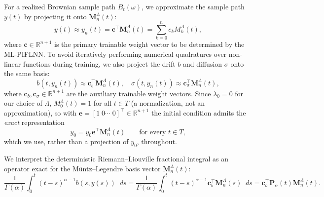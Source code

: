 \documentclass[11pt, a4paper]{article}
\theoremstyle{theoremstyle}
\theoremstyle{definitionstyle}
\newcommand{\dd}{\mathop{}\!d}
\begin{document}
For a realized Brownian sample path $B_t(\omega)$, we approximate the sample path $y(t)$ by projecting it onto $\mathbf M^\Lambda_n(t)$:
\begin{equation}\label{eq:y_approx}
    y(t) \approx y_n(t) = \mathbf c^\top \mathbf M_n^\Lambda (t) = \sum_{k=0}^n c_kM_k^\Lambda(t),
\end{equation}
where $\mathbf c \in \mathbb R^{n+1}$ is the primary trainable weight vector to be determined by the ML-PIFLNN. To avoid iteratively performing numerical quadratures over non-linear functions during training, we also project the drift $b$ and diffusion $\sigma$ onto the same basis:
\begin{equation}\label{eq:phy_approx}
    b(t, y_n(t)) \approx \mathbf c_b^\top \mathbf M_n^\Lambda(t), \quad \sigma(t, y_n(t)) \approx \mathbf c_\sigma^\top \mathbf M^\Lambda_n(t),
\end{equation}
where $\mathbf c_b, \mathbf c_\sigma \in \mathbb R^{n+1}$ are the auxiliary trainable weight vectors. Since $\lambda_0=0$ for our choice of $\Lambda$, $M_0^\Lambda(t) = 1$ for all $t \in T$ (a normalization, not an approximation), so with $\mathbf e = [1 \; 0 \cdots \; 0]^\top \in \mathbb R^{n+1}$ the initial condition admits the \emph{exact} representation
\begin{equation}\label{eq:y0_exact}
    y_0 = y_0\mathbf e^\top \mathbf M^\Lambda_n(t) \qquad \text{for every } t \in T,
\end{equation}
which we use, rather than a projection of $y_0$, throughout.

We interpret the deterministic Riemann--Liouville fractional integral as an operator exact for the M\"untz--Legendre basis vector $\mathbf M_n^\Lambda(t)$:
\begin{equation}\label{eq:det_approx_matrix}
    \frac 1{\Gamma(\alpha)}\int_0^t (t - s)^{\alpha-1}b(s, y(s))\dd{s} = \frac 1{\Gamma(\alpha)}\int_0^t (t - s)^{\alpha-1} \mathbf c_b^\top \mathbf M_n^\Lambda(s) \dd{s} = \mathbf c_b^\top \mathbf P_\alpha(t) \mathbf M_n^\Lambda (t).
\end{equation}
\end{document}
